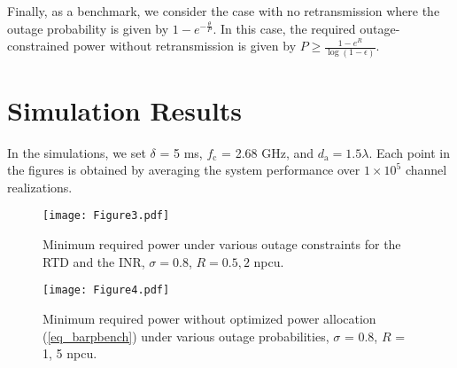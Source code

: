 Finally, as a benchmark, we consider the case with no retransmission where the outage probability is given by $1-e^{-\frac{\theta}{P}}$. In this case, the required outage-constrained power without retransmission is given by $P \geq \frac{1-e^{R}}{\log(1-\epsilon)}$.












\section{{Simulation Results}}

In the simulations, we set $ \delta$ = 5 ms, $f_\text{c}$ = 2.68 GHz, and $d_\text{a} = 1.5\lambda$. Each point in the figures is obtained by averaging the system performance over $1\times10^5$ channel realizations. 

\begin{figure}
\centering
  \texttt{[image: Figure3.pdf]}\\
\caption{Minimum required power under various outage constraints for the RTD and the INR, $\sigma = 0.8$, $R = 0.5, 2$ npcu.}\label{figure3}
\end{figure}

\begin{figure}
\centering
  \texttt{[image: Figure4.pdf]}\\
\caption{Minimum required power without optimized power allocation (\ref{eq_barpbench}) under various outage probabilities, $\sigma$ = 0.8, $R$ = 1, 5 npcu.}\label{figure4}
\end{figure}


